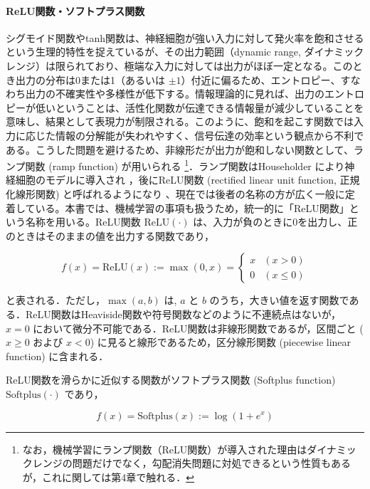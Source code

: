 \documentclass[titlepage]{ltjsbook}
\begin{document}
\paragraph{ReLU関数・ソフトプラス関数}
シグモイド関数やtanh関数は、神経細胞が強い入力に対して発火率を飽和させるという生理的特性を捉えているが、その出力範囲（dynamic range, ダイナミックレンジ）は限られており、極端な入力に対しては出力がほぼ一定となる。このとき出力の分布は0または1（あるいは $\pm 1$）付近に偏るため、エントロピー、すなわち出力の不確実性や多様性が低下する。情報理論的に見れば、出力のエントロピーが低いということは、活性化関数が伝達できる情報量が減少していることを意味し、結果として表現力が制限される。このように、飽和を起こす関数では入力に応じた情報の分解能が失われやすく、信号伝達の効率という観点から不利である。こうした問題を避けるため、非線形だが出力が飽和しない関数として、ランプ関数 (ramp function) が用いられる \footnote{なお，機械学習にランプ関数（ReLU関数）が導入された理由はダイナミックレンジの問題だけでなく，勾配消失問題に対処できるという性質もあるが，これに関しては第4章で触れる．}．ランプ関数はHouseholder により神経細胞のモデルに導入され \citep{householder1941theory}，後にReLU関数 (rectified linear unit function, 正規化線形関数) と呼ばれるようになり \citep{nair2010rectified}、現在では後者の名称の方が広く一般に定着している。本書では、機械学習の事項も扱うため，統一的に「ReLU関数」という名称を用いる。ReLU関数 $\textrm{ReLU}(\cdot)$ は、入力が負のときに0を出力し、正のときはそのままの値を出力する関数であり，

\begin{equation}
f(x) = \textrm{ReLU}(x):=\max(0, x)=
\begin{cases}
x & (x > 0) \\
0 & (x \leq 0)
\end{cases}
\end{equation}

と表される．ただし，$\max(a, b)$ は, $a$ と $b$ のうち，大きい値を返す関数である．ReLU関数はHeaviside関数や符号関数などのように不連続点はないが，$x=0$ において微分不可能である．ReLU関数は非線形関数であるが，区間ごと ($x\geq 0$ および $x<0$) に見ると線形であるため，区分線形関数 (piecewise linear function) に含まれる．

ReLU関数を滑らかに近似する関数がソフトプラス関数 (Softplus function) $\textrm{Softplus}(\cdot)$ であり，

\begin{equation}
f(x) = \textrm{Softplus}(x):=\log(1+e^x)
\end{equation}
\end{document}
